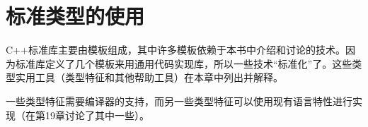 \chapter{标准类型的使用}
C++标准库主要由模板组成，其中许多模板依赖于本书中介绍和讨论的技术。因为标准库定义了几个模板来用通用代码实现库，所以一些技术“标准化”了。这些类型实用工具（类型特征和其他帮助工具）在本章中列出并解释。

一些类型特征需要编译器的支持，而另一些类型特征可以使用现有语言特性进行实现（在第19章讨论了其中一些）。






